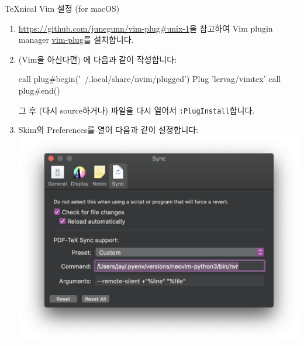 \documentclass{beamer}
\begin{document}
\begin{frame}{\TeX{}nical Vim 설정 (for macOS)}
\begin{enumerate}
    \framebreak
    \item \url{https://github.com/junegunn/vim-plug#unix-1}을 참고하여 Vim
      plugin manager \href{https://github.com/junegunn/vim-plug}{vim-plug}를
      설치합니다.
    \item (Vim을 아신다면) 에 다음과 같이
      작성합니다:
      \begin{vimcode}
        call plug#begin('~/.local/share/nvim/plugged')
        Plug 'lervag/vimtex'
        call plug#end()
      \end{vimcode}
      그 후 (다시 source하거나) 파일을 다시 열어서 \verb/:PlugInstall/합니다.

    \framebreak
    \item Skim의 Preferences를 열어 다음과 같이 설정합니다:
      \centering\includegraphics[width=0.9\linewidth]{figures/skim-sync}
  \end{enumerate}
\end{frame}
\end{document}
